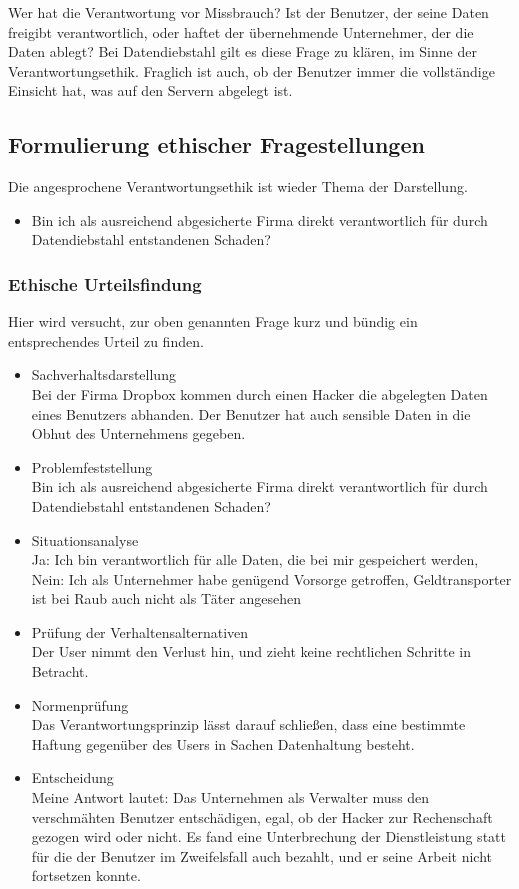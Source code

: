 \documentclass[letterpaper, 12pt]{article}
\let\tempsubsection\subsection
\renewcommand\subsection[1]{\vspace{0cm}\tempsubsection{#1}\vspace{0cm}}
\let\tempsubsubsection\subsubsection
\renewcommand\subsubsection[1]{\vspace{0cm}\tempsubsubsection{#1}\vspace{0cm}}
\begin{document}
Wer hat die Verantwortung vor Missbrauch? Ist der Benutzer, der seine Daten freigibt verantwortlich, oder haftet der übernehmende Unternehmer, der die Daten ablegt? Bei Datendiebstahl gilt es diese Frage zu klären, im Sinne der Verantwortungsethik. Fraglich ist auch, ob der Benutzer immer die vollständige Einsicht hat, was auf den Servern abgelegt ist.

\subsection{Formulierung ethischer Fragestellungen}

Die angesprochene Verantwortungsethik ist wieder Thema der Darstellung.

\begin{itemize}
	\item Bin ich als ausreichend abgesicherte Firma direkt verantwortlich für durch Datendiebstahl
entstandenen Schaden?
\end{itemize}

\subsubsection{Ethische Urteilsfindung}

Hier wird versucht, zur oben genannten Frage kurz und bündig ein entsprechendes Urteil zu finden.

\begin{itemize}
	\item Sachverhaltsdarstellung \\
	Bei der Firma Dropbox kommen durch einen Hacker die abgelegten Daten eines Benutzers abhanden. Der Benutzer hat auch sensible Daten in die Obhut des Unternehmens gegeben.
	\item Problemfeststellung \\
	Bin ich als ausreichend abgesicherte Firma direkt verantwortlich für durch Datendiebstahl
entstandenen Schaden?
	\item Situationsanalyse \\
	Ja: Ich bin verantwortlich für alle Daten, die bei mir gespeichert werden, Nein: Ich als Unternehmer habe genügend Vorsorge getroffen, Geldtransporter ist bei Raub auch nicht als Täter angesehen
	\item Prüfung der Verhaltensalternativen \\
	Der User nimmt den Verlust hin, und zieht keine rechtlichen Schritte in Betracht.
	\item Normenprüfung \\
	Das Verantwortungsprinzip lässt darauf schließen, dass eine bestimmte Haftung gegenüber des Users in Sachen Datenhaltung besteht. 
	\item Entscheidung \\
	Meine Antwort lautet: Das Unternehmen als Verwalter muss den verschmähten Benutzer entschädigen, egal, ob der Hacker zur Rechenschaft gezogen wird oder nicht. Es fand eine Unterbrechung der Dienstleistung statt für die der Benutzer im Zweifelsfall auch bezahlt, und er seine Arbeit nicht fortsetzen konnte.
\end{itemize}

\clearpage



\end{document}
